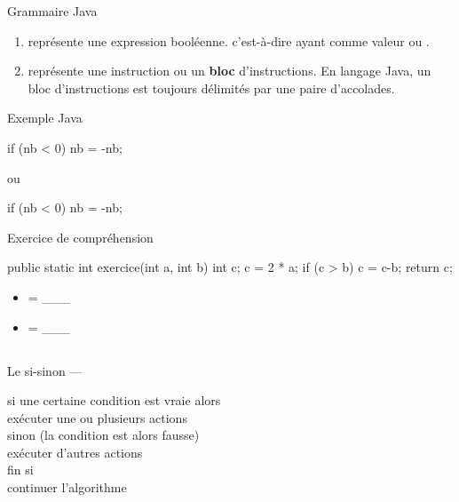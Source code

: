 \begin{hideedit}
\begin{frame}[fragile]{Grammaire Java}
  \begin{enumerate}
    \item {} représente une expression booléenne.
      c'est-à-dire ayant comme valeur  ou .
    \item {} représente une instruction ou un
      \textbf{bloc} d'instructions. En langage Java, un bloc
       d'instructions est toujours délimités par une paire
      d'accolades.
  \end{enumerate}
\end{frame}

\begin{frame}[fragile]{Exemple Java}

  \begin{java}
if (nb < 0)
  nb = -nb;
  \end{java}

  ou
  \begin{java}
if (nb < 0) {
  nb = -nb;
}
  \end{java}

\end{frame}

\begin{frame}[fragile]{Exercice de compréhension}
  \begin{java}
public static int exercice(int a, int b) {
  int c;
  c = 2 * a;
  if (c > b) {
      c = c-b;
  }
  return c;
}
  \end{java}

  \begin{multicols}{2}
    \begin{itemize}[<+->]
      \item {} = \_\_\_
      \item {} = \_\_\_
    \end{itemize}
  \end{multicols}
\end{frame}

\subsection{}
\begin{frame}{Le si-sinon --- }
  \begin{langagenaturel}
    si une certaine condition est vraie alors\\
      \tab exécuter une ou plusieurs actions\\
    sinon (la condition est alors fausse)\\
      \tab exécuter d'autres actions\\
    fin si\\
    continuer l'algorithme
  \end{langagenaturel}
\end{frame}


\end{hideedit}
